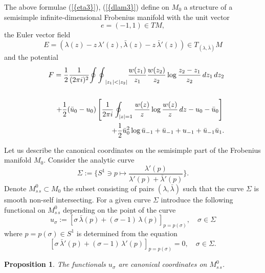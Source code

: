 \documentclass[numbook, envcountsame, envcountreset]{svjour3}
\newtheorem{prop}[theorem]{Proposition}
\begin{document}
\begin{theorem}\label{t-main} The above formulae {(\ref{{eta3}})}, {(\ref{{dlam3}})} define on $M_0$ a structure of a semisimple infinite-dimensional Frobenius manifold with the unit vector 
\begin{equation}\label{unit1}
e=(-1,1)\in TM,
\end{equation}
the Euler vector field
\begin{equation}\label{euler}
E=\left( \lambda(z) -z\, \lambda'(z), \bar\lambda(z) -z\, \bar\lambda'(z)\right)\in T_{(\lambda, \bar\lambda)}M
\end{equation}
and the potential 
\begin{eqnarray}\label{pot}
&&
F=\frac12\frac1{(2\pi i)^2} {\oint\oint}_{|z_1|<|z_2|} \frac{w(z_1)}{z_1}\frac{w(z_2)}{z_2} \log\frac{z_2-z_1}{z_2}\, dz_1\, dz_2
{\nonumber}\\
&&
\\
&&
+\frac12 (\bar u_0 - u_0) \left[ \frac1{2\pi i} \oint_{|z|=1} \frac{w(z)}{z} \log\frac{w(z)}{z}\, dz - u_0 - \bar u_0\right]
{\nonumber}\\
&&
+\frac12 \bar u_0^2 \log \bar u_{-1} +\bar u_{-1} +u_{-1} +\bar u_{-1} \bar u_1.
{\nonumber}
\end{eqnarray}
\end{theorem}

Let us describe the canonical coordinates \cite{icm} on the semisimple
part of the Frobenius manifold $M_0$. Consider the analytic curve 
\begin{equation}\label{sig1}
\Sigma:= \{ S^1\ni p\mapsto \frac{\lambda'(p)}{\lambda'(p) +\bar\lambda'(p)}\}.
\end{equation}
Denote $M^0_{s\, s}\subset M_0$ the subset consisting of pairs $(\lambda, \bar\lambda)$ such that the curve $\Sigma$ is smooth non-self intersecting. For a given curve $\Sigma$ introduce the following functional on $M_{s\, s}^0$ depending on the point of the curve
\begin{equation}\label{sig2}
u_\sigma:= \left[\sigma\,\bar\lambda(p) +(\sigma-1)\, \lambda(p)\right]_{p=p(\sigma)}, \quad \sigma\in\Sigma
\end{equation}
where $p=p(\sigma)\in S^1$ is determined from the equation
\begin{equation}\label{sig3}
\left[\sigma\,\bar\lambda'(p) +(\sigma-1)\, \lambda'(p)\right]_{p=p(\sigma)}=0,\quad \sigma\in\Sigma.
\end{equation}

\begin{prop} \label{prop4}The functionals $u_\sigma$ are canonical coordinates on $M_{s\, s}^0$.
\end{prop}
\end{document}

